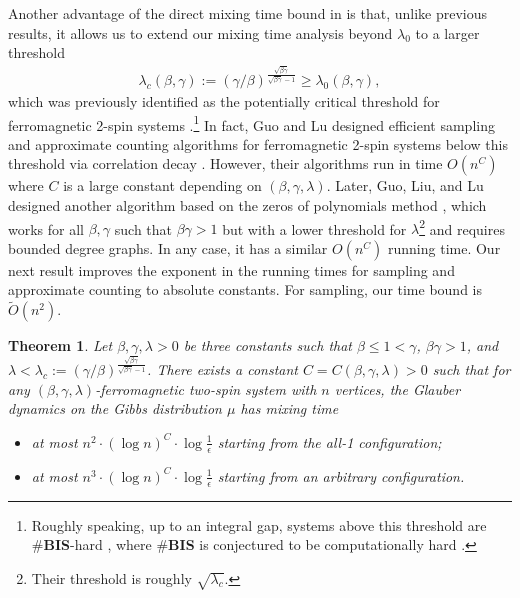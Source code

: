 \documentclass[11pt]{amsart}
\newcommand{\defeq}{:=}
\newcommand{\BIS}{\#\textnormal{\textbf{BIS}}}
\newtheorem{theorem}{Theorem}
\theoremstyle{definition}
\theoremstyle{remark}
\begin{document}
Another advantage of the direct mixing time bound in  is that, unlike previous results, it allows us to extend our mixing time analysis beyond $\lambda_0$ to a larger threshold
\begin{align*}
  \lambda_c(\beta,\gamma) \defeq (\gamma/\beta)^{\frac{\sqrt{\beta \gamma}}{\sqrt{\beta \gamma}-1}} \geq \lambda_0(\beta,\gamma),
\end{align*}
which was previously identified as the potentially critical threshold for ferromagnetic 2-spin systems \cite{GuoL18}.\footnote{Roughly speaking, up to an integral gap, systems above this threshold are \BIS-hard \cite{LiuLZ14}, where \BIS{} is conjectured to be computationally hard \cite{DGGJ04}. }
In fact, Guo and Lu \cite{GuoL18} designed efficient sampling and approximate counting algorithms for ferromagnetic 2-spin systems below this threshold via correlation decay \cite{weitz2006counting}.
However, their algorithms run in time $O(n^C)$ where $C$ is a large constant depending on $(\beta,\gamma,\lambda)$.
Later, Guo, Liu, and Lu \cite{GLL20} designed another algorithm based on the zeros of polynomials method \cite{Bar16,PR17},
which works for all $\beta,\gamma$ such that $\beta\gamma>1$ but with a lower threshold for $\lambda$\footnote{Their threshold is roughly $\sqrt{\lambda_c}$.} and requires bounded degree graphs.
In any case, it has a similar $O(n^C)$ running time.
Our next result improves the exponent in the running times for sampling and approximate counting to absolute constants.
For sampling, our time bound is $\widetilde{O}(n^2)$.
\begin{theorem}\label{thm:glauber-mixing-1}
        Let $\beta,\gamma,\lambda > 0$ be three constants such that $\beta \leq 1 < \gamma$, $\beta\gamma > 1$, and $\lambda < \lambda_c \defeq (\gamma/\beta)^{\frac{\sqrt{\beta \gamma}}{\sqrt{\beta \gamma}-1}} $.  There exists a constant $C = C(\beta,\gamma,\lambda) > 0$ such that for any $(\beta,\gamma,\lambda)$-ferromagnetic two-spin system with $n$ vertices, the Glauber dynamics on the Gibbs distribution $\mu$ has mixing time
        \begin{itemize}
            \item at most $n^2 \cdot (\log n)^{C} \cdot \log \frac{1}{\epsilon}$ starting from the all-1 configuration;
            \item at most $n^3 \cdot (\log n)^{C} \cdot \log \frac{1}{\epsilon}$ starting from an arbitrary configuration.
        \end{itemize}
\end{theorem}
\end{document}
